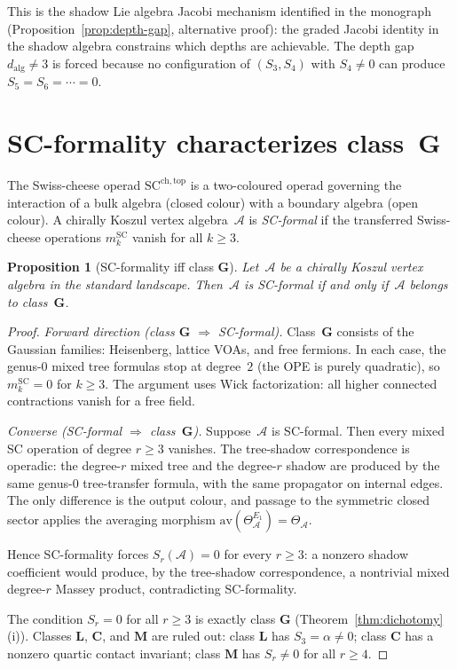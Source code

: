 \documentclass[11pt,reqno]{amsart}
\newtheorem{proposition}[theorem]{Proposition}
\theoremstyle{definition}
\theoremstyle{remark}
\newcommand{\cA}{\mathcal{A}}
\numberwithin{equation}{section}
\begin{document}
This is the shadow Lie algebra Jacobi mechanism identified
in the monograph (Proposition~\ref{prop:depth-gap},
alternative proof): the graded Jacobi identity in the
shadow algebra constrains which depths are achievable.
The depth gap $d_{\mathrm{alg}} \ne 3$ is forced because
no configuration of $(S_3, S_4)$ with $S_4 \ne 0$ can
produce $S_5 = S_6 = \cdots = 0$.



\section{SC-formality characterizes
class~$\mathbf{G}$}\label{sec:sc-formal}

The Swiss-cheese operad $\mathrm{SC}^{\mathrm{ch,top}}$ is a
two-coloured operad governing the interaction of a bulk
algebra (closed colour) with a boundary algebra (open
colour). A chirally Koszul vertex algebra~$\cA$ is
\emph{SC-formal} if the transferred Swiss-cheese operations
$m_k^{\mathrm{SC}}$ vanish for all $k \ge 3$.

\begin{proposition}[SC-formality iff class
$\mathbf{G}$]\label{prop:sc-formal}
Let~$\cA$ be a chirally Koszul vertex algebra in the
standard landscape. Then~$\cA$ is SC-formal if and only
if~$\cA$ belongs to class~$\mathbf{G}$.
\end{proposition}

\begin{proof}
\emph{Forward direction (class $\mathbf{G}$
$\Longrightarrow$ SC-formal).}
Class~$\mathbf{G}$ consists of the Gaussian families:
Heisenberg, lattice VOAs, and free fermions. In each case,
the genus-$0$ mixed tree formulas stop at degree~$2$ (the
OPE is purely quadratic), so
$m_k^{\mathrm{SC}} = 0$ for $k \ge 3$. The argument uses
Wick factorization: all higher connected contractions
vanish for a free field.

\emph{Converse (SC-formal $\Longrightarrow$
class~$\mathbf{G}$).}
Suppose~$\cA$ is SC-formal. Then every mixed SC operation
of degree $r \ge 3$ vanishes. The tree-shadow
correspondence is operadic: the degree-$r$ mixed tree and
the degree-$r$ shadow are produced by the same genus-$0$
tree-transfer formula, with the same propagator on internal
edges. The only difference is the output colour, and passage
to the symmetric closed sector applies the averaging morphism
$\mathrm{av}(\Theta_\cA^{E_1}) = \Theta_\cA$.

Hence SC-formality forces $S_r(\cA) = 0$ for every
$r \ge 3$: a nonzero shadow coefficient would produce,
by the tree-shadow correspondence, a nontrivial mixed
degree-$r$ Massey product, contradicting SC-formality.

The condition $S_r = 0$ for all $r \ge 3$ is exactly class
$\mathbf{G}$ (Theorem~\ref{thm:dichotomy}(i)). Classes
$\mathbf{L}$, $\mathbf{C}$, and $\mathbf{M}$ are ruled out:
class $\mathbf{L}$ has $S_3 = \alpha \ne 0$; class
$\mathbf{C}$ has a nonzero quartic contact invariant;
class $\mathbf{M}$ has $S_r \ne 0$ for all $r \ge 4$.
\end{proof}
\end{document}
